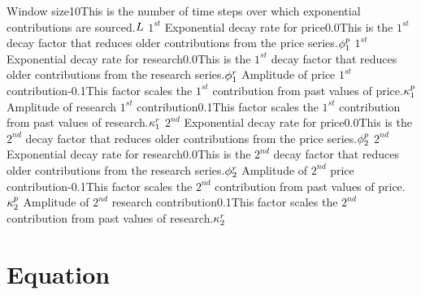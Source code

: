 \documentclass{article}
\begin{document}
\logo
{}

\tblofcontents


{Window size}{10}{This is the number of time steps over which exponential contributions are sourced.}{$L$}
{$1^{st}$ Exponential decay rate for price}{0.0}{This is the $1^{st}$ decay factor that reduces older contributions from the price series.}{$\phi_{1}^{p}$}
{$1^{st}$ Exponential decay rate for research}{0.0}{This is the $1^{st}$ decay factor that reduces older contributions from the research series.}{$\phi_{1}^{r}$}
{Amplitude of price $1^{st}$ contribution}{-0.1}{This factor scales the $1^{st}$ contribution from past values of price.}{$\kappa_{1}^{p}$}
{Amplitude of research $1^{st}$ contribution}{0.1}{This factor scales the $1^{st}$ contribution from past values of research.}{$\kappa_{1}^{r}$}
{$2^{nd}$ Exponential decay rate for price}{0.0}{This is the $2^{nd}$ decay factor that reduces older contributions from the price series.}{$\phi_{2}^{p}$}
{$2^{nd}$ Exponential decay rate for research}{0.0}{This is the $2^{nd}$ decay factor that reduces older contributions from the research series.}{$\phi_{2}^{r}$}
{Amplitude of $2^{nd}$ price contribution}{-0.1}{This factor scales the $2^{nd}$ contribution from past values of price.}{$\kappa_{2}^{p}$}
{Amplitude of $2^{nd}$ research contribution}{0.1}{This factor scales the $2^{nd}$ contribution from past values of research.}{$\kappa_{2}^{r}$}
\stoptable

\section{Equation}
\end{document}
